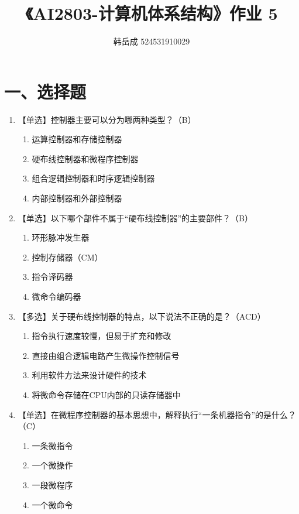 \documentclass[12pt, a4paper]{article}
\title{\textbf{《AI2803-计算机体系结构》作业 5}}
\author{韩岳成 524531910029}
\date{}
\begin{document}
\maketitle

\section*{一、选择题}

\begin{enumerate}[label=\arabic*.]
    \item 【单选】控制器主要可以分为哪两种类型？（B）
    \begin{enumerate}[label=\Alph*.]
        \item 运算控制器和存储控制器 \item 硬布线控制器和微程序控制器
        \item 组合逻辑控制器和时序逻辑控制器 \item 内部控制器和外部控制器
    \end{enumerate}
    
    \item 【单选】以下哪个部件不属于“硬布线控制器”的主要部件？（B）
    \begin{enumerate}[label=\Alph*.]
        \item 环形脉冲发生器 \item 控制存储器（CM）
        \item 指令译码器 \item 微命令编码器
    \end{enumerate}

    \item 【多选】关于硬布线控制器的特点，以下说法不正确的是？（ACD）
    \begin{enumerate}[label=\Alph*.]
        \item 指令执行速度较慢，但易于扩充和修改 \item 直接由组合逻辑电路产生微操作控制信号
        \item 利用软件方法来设计硬件的技术 \item 将微命令存储在CPU内部的只读存储器中
    \end{enumerate}

    \item 【单选】在微程序控制器的基本思想中，解释执行“一条机器指令”的是什么？（C）
    \begin{enumerate}[label=\Alph*.]
        \item 一条微指令 \item 一个微操作 \item 一段微程序 \item 一个微命令
    \end{enumerate}


\end{enumerate}
\end{document}
